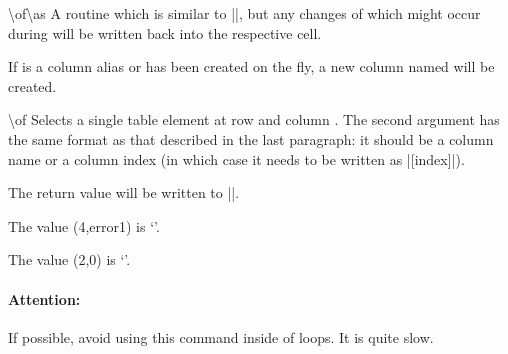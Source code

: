 \begin{command}{\pgfplotstablemodifyeachcolumnelement{}\textbackslash of\textbackslash as}
    A routine which is similar to |\pgfplotstableforeachcolumnelement|, but any
    changes of  which might occur during
     will be written back into the respective cell.
\begin{codeexample}[pre={\begin{lateximage}},post={\end{lateximage}}]
\loadedtable
{}\of\loadedtable\as\cell{%
    \edef\cell{\#\pgfplotstablerow: \cell}%
}
\pgfplotstabletypeset[columns=error1,string type]{\loadedtable}
\end{codeexample}

    If  is a column alias or has been created on the fly, a
    new column named  will be created.
\end{command}

\begin{command}{\pgfplotstablegetelem{}\textbackslash of}
    Selects a single table element at row  and column . The
    second argument has the same format as that described in the last
    paragraph: it should be a column name or a column index (in which case it
    needs to be written as |[index]|).

    The return value will be written to |\pgfplotsretval|.
\begin{codeexample}[pre={\begin{lateximage}},post={\end{lateximage}}]
\of{\loadedtable}
The value (4,error1) is `\pgfplotsretval'.

\of{\loadedtable}
The value (2,0) is `\pgfplotsretval'.
\end{codeexample}

    \paragraph{Attention:}

    If possible, avoid using this command inside of loops. It is quite slow.
\end{command}

